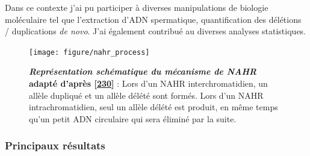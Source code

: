 \documentclass[12pt,a4paper,twoside]{ugathesis}
\theoremstyle{definition}
\theoremstyle{definition}
\theoremstyle{definition}
\theoremstyle{remark}
\begin{document}
Dans ce contexte j'ai pu participer à diverses manipulations de biologie
moléculaire tel que l'extraction d'ADN spermatique, quantification des
délétions / duplications \emph{de novo}. J'ai également contribué au
diverses analyses statistiques.

\newpage 

\begin{figure}

{\centering \texttt{[image: figure/nahr\_process]} 

}

\caption[Représentation schématique du mécanisme de NAHR]{\textbf{\emph{Représentation schématique du mécanisme de
NAHR} adapté d'après {[}\protect\hyperlink{ref-Liu2012}{230}{]}} : Lors
d'un NAHR interchromatidien, un allèle dupliqué et un allèle délété sont
formés. Lors d'un NAHR intrachromatidien, seul un allèle délété est
produit, en même temps qu'un petit ADN circulaire qui sera éliminé par
la suite.}\label{fig:pictnahr}
\end{figure}








\newpage



\newpage

\subsubsection{Principaux résultats}\label{principaux-resultats-5}
\end{document}
